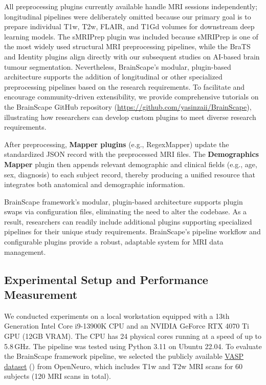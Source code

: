 All preprocessing plugins currently available handle MRI sessions independently; 
longitudinal pipelines were deliberately omitted because our primary goal is to prepare 
individual T1w, T2w, FLAIR, and T1Gd volumes for downstream deep learning models.
The sMRIPrep plugin was included because sMRIPrep is one of the most widely used structural MRI preprocessing pipelines, 
while the BraTS and Identity plugins align directly with our subsequent studies on AI-based brain tumour segmentation.
Nevertheless, BrainScape's modular, plugin-based architecture supports the addition of longitudinal or 
other specialized preprocessing pipelines based on the research requirements. 
To facilitate and encourage community-driven extensibility, we provide comprehensive tutorials 
on the BrainScape GitHub repository (\url{https://github.com/yasinzaii/BrainScape}), 
illustrating how researchers can develop custom plugins to meet diverse research requirements.

After preprocessing, \textbf{Mapper plugins} (e.g., RegexMapper) update the standardized JSON record 
with the preprocessed MRI files. The \textbf{Demographics Mapper} plugin then appends relevant demographic 
and clinical fields (e.g., age, sex, diagnosis) to each subject record, thereby producing a unified 
resource that integrates both anatomical and demographic information.

BrainScape framework's modular, plugin-based architecture supports plugin swaps via configuration files, 
eliminating the need to alter the codebase. As a result, researchers can 
readily include additional plugins supporting specialized pipelines for their unique study requirements. 
BrainScape's pipeline workflow and configurable plugins provide a robust, adaptable system for MRI data management.


\subsection{Experimental Setup and Performance Measurement}

We conducted experiments on a local workstation equipped with a 13th Generation Intel Core i9-13900K CPU 
and an NVIDIA GeForce RTX 4070 Ti GPU (12GB VRAM). 
The CPU has 24 physical cores running at a speed of up to 5.8\,GHz. 
The pipeline was tested using Python 3.11 on Ubuntu 22.04.
To evaluate the BrainScape framework pipeline, 
we selected the publicly available \href{https://openneuro.org/datasets/ds003717}{VASP dataset} (\cite{peelle2022increased}) from OpenNeuro, 
which includes T1w and T2w MRI scans for 60 subjects (120 MRI scans in total). 

